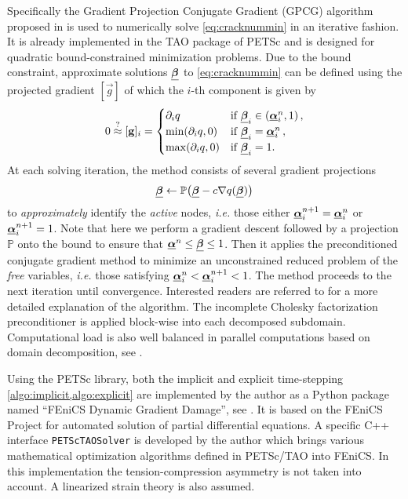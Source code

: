 Specifically the Gradient Projection Conjugate Gradient (GPCG) algorithm proposed in \cite{MoreToraldo:1991} is used to numerically solve \eqref{eq:cracknummin} in an iterative fashion. It is already implemented in the TAO package of PETSc and is designed for quadratic bound-constrained minimization problems. Due to the bound constraint, approximate solutions $\bvec$ to \eqref{eq:cracknummin} can be defined using the projected gradient $[\vec{g}]$ of which the $i$-th component is given by
\[
0\overset{?}{\approx}[\vec{g}]_i=\begin{cases}
\partial_i q & \text{if $\bvec_i\in(\dvec_i^n,1)$}\,, \\
\min(\partial_i q, 0) & \text{if $\bvec_i=\dvec_i^n$}\,, \\
\max(\partial_i q, 0) & \text{if $\bvec_i=1$}.
\end{cases}
\]
At each solving iteration, the method consists of several gradient projections
\[
\bvec\gets\mathbb{P}\bigl(\bvec-c\nabla q(\bvec)\bigr)
\]
to \emph{approximately} identify the \emph{active} nodes, \emph{i.e.} those either $\dvec_i^{n+1}=\dvec_i^n$ or $\dvec_i^{n+1}=1$. Note that here we perform a gradient descent followed by a projection $\mathbb{P}$ onto the bound to ensure that $\dvec^n\leq\bvec\leq 1$. Then it applies the preconditioned conjugate gradient method to minimize an unconstrained reduced problem of the \emph{free} variables, \emph{i.e.} those satisfying $\dvec_i^n<\dvec_i^{n+1}<1$. The method proceeds to the next iteration until convergence. Interested readers are referred to \cite{MoreToraldo:1991} for a more detailed explanation of the algorithm. The incomplete Cholesky factorization preconditioner is applied block-wise into each decomposed subdomain. Computational load is also well balanced in parallel computations based on domain decomposition, see \cite{BensonMcInnesMore:2001}.

Using the PETSc library, both the implicit and explicit time-stepping \cref{algo:implicit,algo:explicit} are implemented by the author as a Python package named ``FEniCS Dynamic Gradient Damage'', see \cite{LiMaurini:2015}. It is based on the FEniCS Project \cite{LoggMardalWells:2012} for automated solution of partial differential equations. A specific C++ interface \texttt{PETScTAOSolver} is developed by the author which brings various mathematical optimization algorithms defined in PETSc/TAO into FEniCS. In this implementation the tension-compression asymmetry is not taken into account. A linearized strain theory is also assumed.

